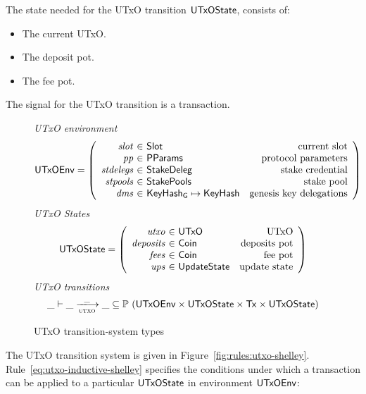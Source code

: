 The state needed for the UTxO transition $\mathsf{UTxOState}$, consists of:

\begin{itemize}
  \item The current UTxO.
  \item The deposit pot.
  \item The fee pot.
\end{itemize}
The signal for the UTxO transition is a transaction.

\begin{figure}[htb]
  \emph{UTxO environment}
  \begin{equation*}
    \UTxOEnv =
    \left(
      \begin{array}{r@{~\in~}lr}
        \var{slot} & \Slot & \text{current slot}\\
        \var{pp} & \PParams & \text{protocol parameters}\\
        \var{stdelegs} & \StakeDeleg & \text{stake credential}\\
        \var{stpools} & \StakePools & \text{stake pool}\\
        \var{dms} & \KeyHashGen\mapsto\KeyHash & \text{genesis key delegations} \\
      \end{array}
    \right)
  \end{equation*}
  \emph{UTxO States}
  \begin{equation*}
    \UTxOState =
    \left(
      \begin{array}{r@{~\in~}lr}
        \var{utxo} & \UTxO & \text{UTxO}\\
        \var{deposits} & \Coin & \text{deposits pot}\\
        \var{fees} & \Coin & \text{fee pot}\\
        \var{ups} & \UpdateState & \text{update state}\\
      \end{array}
    \right)
  \end{equation*}
  \emph{UTxO transitions}
  \begin{equation*}
    \_ \vdash
    \var{\_} \trans{utxo}{\_} \var{\_}
    \subseteq \powerset (\UTxOEnv \times \UTxOState \times \Tx \times \UTxOState)
  \end{equation*}
  \caption{UTxO transition-system types}
  \label{fig:ts-types:utxo-shelley}
\end{figure}

The UTxO transition system is given in Figure~\ref{fig:rules:utxo-shelley}.
Rule~\ref{eq:utxo-inductive-shelley} specifies the conditions under which a transaction can
be applied to a particular $\mathsf{UTxOState}$ in environment $\mathsf{UTxOEnv}$:

